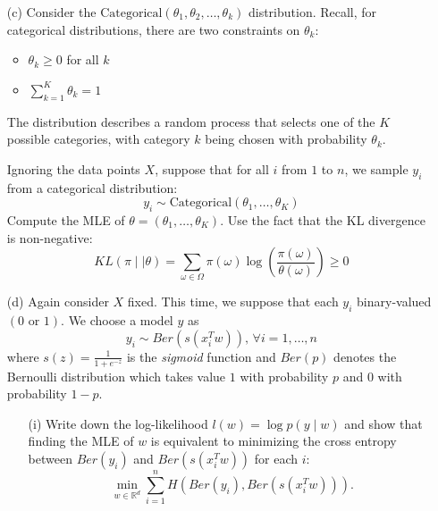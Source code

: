 \documentclass{article}
\begin{document}
\begin{itemize}
        \item [(c)] Consider the $\text{Categorical}(\theta_{1}, \theta_{2}, \ldots, \theta_{k})$ distribution. Recall, for categorical distributions, there are two constraints on $\theta_{k}$:
            \begin{itemize}
                \item $\theta_{k} \geq 0$ for all $k$

                \item $\sum_{k = 1}^{K} \theta_{k} = 1$
            \end{itemize}
        The distribution describes a random process that selects one of the $K$ possible categories, with category $k$ being chosen with probability $\theta_{k}$.

        Ignoring the data points $X$, suppose that for all $i$ from $1$ to $n$, we sample $y_{i}$ from a categorical distribution:
            \begin{equation*}
                y_{i} \sim \text{Categorical}(\theta_{1}, \ldots, \theta_{K})
            \end{equation*}
        Compute the MLE of $\theta = (\theta_{1}, \ldots, \theta_{K})$. Use the fact that the KL divergence is non-negative:
            \begin{equation*}
                KL(\pi \mid\mid \theta) = \sum_{\omega \in \Omega} \pi(\omega) \log\left(\dfrac{\pi(\omega)}{\theta(\omega)}\right) \geq 0
            \end{equation*}
            \begin{answer}
                
            \end{answer}

        \item [(d)] Again consider $X$ fixed. This time, we suppose that each $y_{i}$ binary-valued $(0 \text{ or } 1)$. We choose a model $y$ as 
            \begin{equation*}
                y_{i} \sim Ber(s(x_{i}^{T}w)) , \, \forall i = 1, \ldots, n
            \end{equation*}
        where $s(z) = \frac{1}{1 + e^{-z}}$ is the \textit{sigmoid} function and $Ber(p)$ denotes the Bernoulli distribution which takes value $1$ with probability $p$ and $0$ with probability $1 - p$.
            \begin{itemize}
                \item [(i)] Write down the log-likelihood $l(w) = \log{p(y \mid w)}$ and show that finding the MLE of $w$ is equivalent to minimizing the cross entropy between $Ber(y_{i})$ and $Ber(s(x_{i}^{T}w))$ for each $i$:
                    \begin{equation*}
                        \min_{w \in \mathbb{R}^{d}}\sum_{i = 1}^{n}H(Ber(y_{i}), Ber(s(x_{i}^{T}w))).
                    \end{equation*}


\end{itemize}
\end{itemize}
\end{document}
